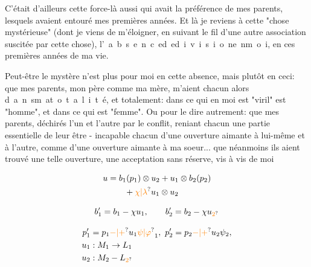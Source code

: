 C'était d'ailleurs cette force-là aussi qui avait la préférence de mes parents, lesquels avaient entouré mes premières années. Et là je reviens à cette "chose mystérieuse" (dont je viens de m'éloigner, en suivant le fil d'une autre association suscitée par cette chose), \mbox{l' a b s e n c e}\quad\mbox{d e}\quad\mbox{d i v i s i o n}\quad\mbox{e n}\quad\mbox{m o i}, en ces premières années de ma vie.

Peut-être le mystère n'est plus pour moi en cette absence, mais plutôt en ceci: que mes parents, mon père comme ma mère, m'aient chacun alors \mbox{}\quad\mbox{d a n s}\quad\mbox{m a}\quad\mbox{t o t a l i t é}, et totalement: dans ce qui en moi est "viril" est "homme", et dans ce qui est "femme". Ou pour le dire autrement: que mes parents, déchirés l'un et l'autre par le conflit, reniant chacun une partie essentielle de leur être - incapable chacun d'une ouverture aimante à lui-même et à l'autre, comme d'une ouverture aimante à ma soeur... que néanmoins ils aient trouvé une telle ouverture, une acceptation sans réserve, vis à vis de moi



\[
\begin{aligned}
u&=b_1(p_1)\otimes u_2+u_1\otimes b_2(p_2)\\
 &\qquad+\unsure{\chi|\lambda}u_1\otimes u_2
\end{aligned}
\]

\[
b'_1=b_1-\chi u_1,\qquad b'_2=b_2-\chi u_{\unsure{2}}
\]

\[
\begin{aligned}
p'_1&=p_1\unsure{-|+}u_1\unsure{\psi|\varphi}_1,\ p'_2=p_2\unsure{-|+}u_2\psi_2,\\
u_1&:M_1\to L_1\\ u_2&:M_2-L_{\unsure{2}}
\end{aligned}
\]

